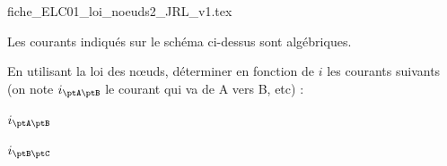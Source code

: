 \finEntrainement





\hauteurLargeurCadreReponse		{7mm}{3cm}
\initialisationEntrainement
\begin{center}
{fiche_ELC01_loi_noeuds2_JRL_v1.tex}
\end{center}
Les courants indiqués sur le schéma ci-dessus sont algébriques.

En utilisant la loi des nœuds, déterminer en fonction de $i$ les courants suivants (on note $i_{\ptA\ptB}$ le courant qui va de A vers B, etc) :
\debutEntrainement



\begin{enonce}
$i_{\ptA\ptB}$
\end{enonce}




\begin{enonce}
$i_{\ptB\ptC}$
\end{enonce}

